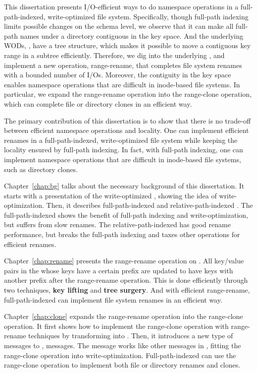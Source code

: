 This dissertation presents I/O-efficient ways to do namespace operations in a
full-path-indexed, write-optimized file system.
Specifically, though full-path indexing limits possible changes on the schema
level, we observe that it can make all full-path names under a directory
contiguous in the key space.
And the underlying WODs, \bets, have a tree structure, which makes it possible
to move a contiguous key range in a subtree efficiently.
Therefore, we dig into the underlying \bets, and implement a new operation,
range-rename, that completes file system renames with a bounded number of I/Os.
Moreover, the contiguity in the key space enables namespace operations that are
difficult in inode-based file systems.
In particular, we expand the range-rename operation into the range-clone
operation, which can complete file or directory clones in an efficient way.

The primary contribution of this dissertation is to show that there is no
trade-off between efficient namespace operations and locality.
One can implement efficient renames in a full-path-indexed, write-optimized
file system while keeping the locality ensured by full-path indexing.
In fact, with full-path indexing, one can implement namespace operations that
are difficult in inode-based file systems, such as directory clones.

Chapter~\ref{chap:bg} talks about the necessary background of this dissertation.
It starts with a presentation of the write-optimized \bets,
showing the idea of write-optimization.
Then, it describes full-path-indexed \betrfs and relative-path-indexed \betrfs.
The full-path-indexed \betrfs shows the benefit of full-path indexing and
write-optimization, but suffers from slow renames.
The relative-path-indexed \betrfs has good rename performance, but breaks the
full-path indexing and taxes other operations for efficient renames.

Chapter~\ref{chap:rename} presents the range-rename operation on \bets.
All key/value pairs in the \bet whose keys have a certain prefix are updated to
have keys with another prefix after the range-rename operation.
This is done efficiently through two techniques,
\textbf{key lifting} and \textbf{tree surgery}.
And with efficient range-rename, full-path-indexed \betrfs can implement file
system renames in an efficient way.

Chapter~\ref{chap:clone} expands the range-rename operation into the
range-clone operation.
It first shows how to implement the range-clone operation with range-rename
techniques by transforming \bets into \bedags.
Then, it introduces a new type of messages to \bedags, \goto messages.
The \goto message works like other messages in \bedags,
fitting the range-clone operation into write-optimization.
Full-path-indexed \betrfs can use the range-clone operation to implement both
file or directory renames and clones.

